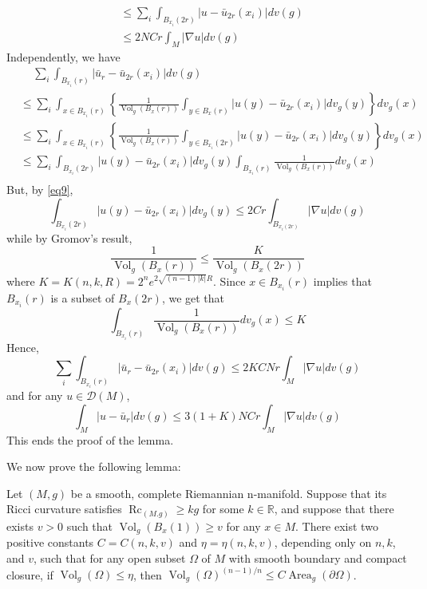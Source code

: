 \documentclass[12pt,hyperref,a4paper,UTF8]{ctexart}
\begin{document}
\begin{Proof}
$$\begin{aligned}
& \leq \sum_i \int_{B_{x_i}(2 r)}\left|u-\bar{u}_{2 r}\left(x_i\right)\right| d v(g) \\
& \leq 2 N C r \int_M|\nabla u| d v(g)
\end{aligned}
$$
Independently, we have
$$
\begin{aligned}
&\quad\,\sum_i \int_{B_{x_i}(r)}\left|\bar{u}_r-\bar{u}_{2 r}\left(x_i\right)\right| d v(g) \\
&\leq \sum_i \int_{x \in B_{x_i}(r)}\left\{\frac{1}{\operatorname{Vol}_g\left(B_x(r)\right)} \int_{y \in B_x(r)}\left|u(y)-\bar{u}_{2 r}\left(x_i\right)\right| d v_g(y)\right\} d v_g(x) \\
&\leq \sum_i \int_{x \in B_{x_i}(r)}\left\{\frac{1}{\operatorname{Vol}_g\left(B_x(r)\right)} \int_{y \in B_{x_i}(2 r)}\left|u(y)-\bar{u}_{2 r}\left(x_i\right)\right| d v_g(y)\right\} d v_g(x) \\
&\leq \sum_i \int_{B_{x_i}(2 r)}\left|u(y)-\bar{u}_{2 r}\left(x_i\right)\right| d v_g(y) \int_{B_{x_i}(r)} \frac{1}{\operatorname{Vol}_g\left(B_x(r)\right)} d v_g(x)\\
\end{aligned}
$$
But, by \autoref{eq9},
$$
\int_{B_{x_i}(2 r)}\left|u(y)-\bar{u}_{2 r}\left(x_i\right)\right| d v_g(y) \leq 2 C r \int_{B_{x_i(2 r)}}|\nabla u| d v(g)
$$
while by Gromov's result,
$$
\frac{1}{\operatorname{Vol}_g\left(B_x(r)\right)} \leq \frac{K}{\operatorname{Vol}_g\left(B_x(2 r)\right)}
$$
where $K=K(n, k, R)=2^n e^{2 \sqrt{(n-1)|k| }R}$. Since $x \in B_{x_i}(r)$ implies that $B_{x_i}(r)$ is a subset of $B_x(2 r)$, we get that
$$
\int_{B_{x_i}(r)} \frac{1}{\operatorname{Vol}_g\left(B_x(r)\right)} d v_g(x) \leq K
$$
Hence,
$$
\sum_i \int_{B_{x_i}(r)}\left|\bar{u}_r-\bar{u}_{2 r}\left(x_i\right)\right| d v(g) \leq 2 K C N r \int_M|\nabla u| d v(g)
$$
and for any $u \in \mathcal{D}(M)$,
$$
\int_M\left|u-\bar{u}_r\right| d v(g) \leq 3(1+K) N C r \int_M|\nabla u| d v(g)
$$
This ends the proof of the lemma.
\end{Proof}

We now prove the following lemma: 

\begin{Lemma}
    Let $(M, g)$ be a smooth, complete Riemannian n-manifold. Suppose that its Ricci curvature satisfies $\operatorname{Rc}_{(M . g)} \geq k g$ for some $k \in \mathbb{R}$, and suppose that there exists $v>0$ such that $\operatorname{Vol}_g\left(B_x(1)\right) \geq v$ for any $x \in M$. There exist two positive constants $C=C(n, k, v)$ and $\eta=\eta(n, k, v)$, depending only on $n, k$, and $v$, such that for any open subset $\Omega$ of $M$ with smooth boundary and compact closure, if $\operatorname{Vol}_g(\Omega) \leq \eta$, then $\operatorname{Vol}_g(\Omega)^{(n-1) / n} \leq C \operatorname{Area}_g(\partial \Omega)$.
\label{lem42}
\end{Lemma}
\end{document}
